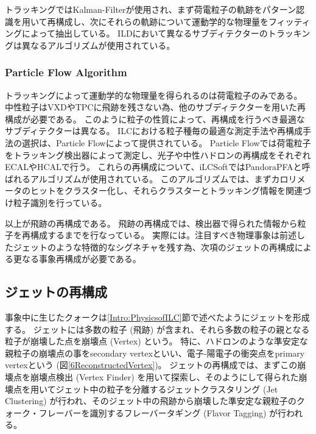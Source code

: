 トラッキングではKalman-Filterが使用され、まず荷電粒子の軌跡をパターン認識を用いて再構成し、次にそれらの軌跡について運動学的な物理量をフィッティングによって抽出している。
ILDにおいて異なるサブディテクターのトラッキングは異なるアルゴリズムが使用されている。

\subsubsection{Particle Flow Algorithm}

トラッキングによって運動学的な物理量を得られるのは荷電粒子のみである。
中性粒子はVXDやTPCに飛跡を残さない為、他のサブディテクターを用いた再構成が必要である。
このように粒子の性質によって、再構成を行うべき最適なサブディテクターは異なる。
ILCにおける粒子種毎の最適な測定手法や再構成手法の選択は、Particle Flowによって提供されている。
Particle Flowでは荷電粒子をトラッキング検出器によって測定し、光子や中性ハドロンの再構成をそれぞれECALやHCALで行う。
これらの再構成について、iLCSoftではPandoraPFAと呼ばれるアルゴリズムが使用されている。
このアルゴリズムでは、まずカロリメータのヒットをクラスター化し、それらクラスターとトラッキング情報を関連づけ粒子識別を行っている。

以上が飛跡の再構成である。
飛跡の再構成では、検出器で得られた情報から粒子を再構成するまでを行なっている。
実際には。注目すべき物理事象は前述したジェットのような特徴的なシグネチャを残す為、次項のジェットの再構成による更なる事象再構成が必要である。


\subsection{ジェットの再構成} \label{Intro:SoftERILC:JetReconstruction}

事象中に生じたクォークは\ref{Intro:PhysicsofILC}節で述べたようにジェットを形成する。
ジェットには多数の粒子 (飛跡) が含まれ、それら多数の粒子の親となる粒子が崩壊した点を崩壊点 (Vertex) という。
特に、ハドロンのような準安定な親粒子の崩壊点の事をsecondary vertexといい、電子-陽電子の衝突点をprimary vertexという (図\ref{6ReconstructedVertex})。
ジェットの再構成では、まずこの崩壊点を崩壊点検出 (Vertex Finder) を用いて探索し、そのようにして得られた崩壊点を用いてジェット中の粒子を分離するジェットクラスタリング (Jet Clustering) が行われ、そのジェット中の飛跡から崩壊した準安定な親粒子のクォーク・フレーバーを識別するフレーバータギング (Flavor Tagging) が行われる。

